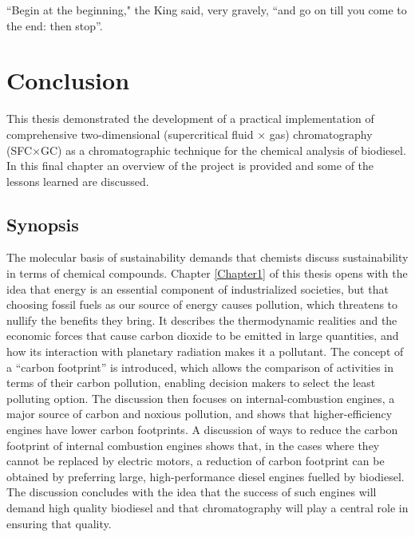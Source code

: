 
\begin{savequote}[\quotewidth]
``Begin at the beginning," the King said, very gravely, ``and go on till you come to the end: then stop''.
\end{savequote}

\chapter{Conclusion} %
\label{Chapter9}


This thesis demonstrated the development of a practical implementation of
comprehensive two-dimensional (supercritical fluid × gas) chromatography
(SFC×GC) as a chromatographic technique for the chemical analysis of biodiesel.
In this final chapter an overview of the project is provided and some of the
lessons learned are discussed.

\section{Synopsis}

The molecular basis of sustainability \autocite{Anastas2016} demands that
chemists discuss sustainability in terms of chemical compounds. Chapter
\ref{Chapter1} of this thesis opens with the idea that energy is an essential
component of industrialized societies, but that choosing fossil fuels as our
source of energy causes pollution, which threatens to nullify the benefits they
bring. It describes the thermodynamic realities and the economic forces that
cause carbon dioxide to be emitted in large quantities, and how its interaction
with planetary radiation makes it a pollutant. The concept of a ``carbon
footprint'' is introduced, which allows the comparison of activities in terms of
their carbon pollution, enabling decision makers to select the least polluting
option. The discussion then focuses on internal-combustion engines, a major
source of carbon and noxious pollution, and shows that higher-efficiency engines
have lower carbon footprints. A discussion of ways to reduce the carbon
footprint of internal combustion engines shows that, in the cases where they
cannot be replaced by electric motors, a reduction of carbon footprint can be
obtained by preferring large, high-performance diesel engines fuelled by
biodiesel. The discussion concludes with the idea that the success of such
engines will demand high quality biodiesel and that chromatography will play a
central role in ensuring that quality.

